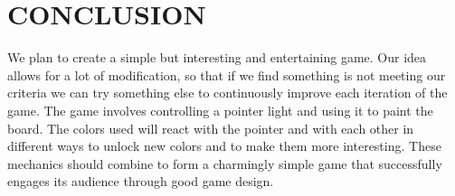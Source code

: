 \documentclass[12pt]{article}
\begin{document}

\section{CONCLUSION}
We plan to create a simple but interesting and entertaining game. Our idea allows for a lot of modification, so that if we find something is not meeting our criteria we can try something else to continuously improve each iteration of the game. The game involves controlling a pointer light and using it to paint the board. The colors used will react with the pointer and with each other in different ways to unlock new colors and to make them more interesting. These mechanics should combine to form a charmingly simple game that successfully engages its audience through good game design.

\newpage
\printbibliography[heading=subbibintoc]
%
%
\end{document}
